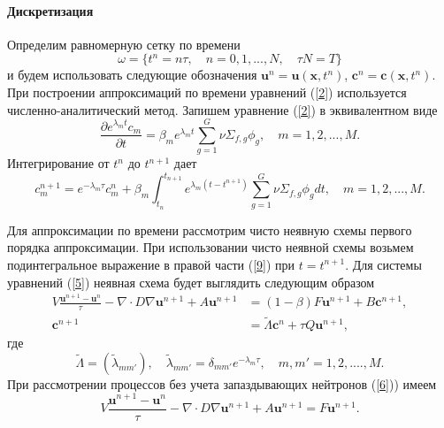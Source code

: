 \documentclass{crm-article}
\begin{document}
\paragraph{Дискретизация}
Определим равномерную сетку по времени
\[
\omega = \{ t^n=n \tau, \quad n = 0,1,...,N, \quad \tau N = T \}
\]
и будем использовать следующие обозначения $\bm{u}^n = \bm{u}(\bm{x}, t^n)$, $\bm c^n = \bm c(\bm{x}, t^n)$. 
При построении аппроксимаций по времени уравнений (\ref{2}) используется численно-аналитический метод.
Запишем уравнение (\ref{2}) в эквивалентном виде
\[
  \frac{\partial e^{\lambda_m t}  c_m}{\partial t} = \beta_m  e^{\lambda_m t} \sum_{g=1}^{G} \nu \Sigma_{f,g} \phi_g,
 \quad m = 1,2, ..., M .
\] 
Интегрирование от $t^{n}$ до $t^{n+1}$ дает
\begin{equation}\label{9}
c_m^{n+1} = e^{-\lambda_m\tau} c_m^n + \beta_m \int_{t_n}^{t_{n+1}}e^{\lambda_m (t-t^{n+1})} \sum_{g=1}^{G} \nu \Sigma_{f,g} \phi_g d t,
 \quad m = 1,2, ..., M.
\end{equation}

Для аппроксимации по времени рассмотрим чисто неявную схемы первого порядка аппроксимации. 
При использовании чисто неявной схемы возьмем подинтегральное выражение в правой части (\ref{9}) при $t = t^{n+1}$. 
Для системы уравнений (\ref{5}) неявная схема будет выглядить следующим образом
\begin{equation}\label{10}
\begin{split}
V \frac{\bm{u}^{n+1} - \bm{u}^n}{\tau} - \nabla\cdot D \nabla\bm{u}^{n+1}  + A\bm{u}^{n+1} &=(1-\beta) F \bm{u}^{n+1} + B\bm c^{n+1},
\\
\bm{c}^{n+1} & = \widetilde{\Lambda}\bm{c}^{n} + \tau Q \bm{u}^{n+1},
\end{split}
\end{equation}
где
\[
\widetilde{\Lambda} = (\widetilde{\lambda}_{mm'}), \quad \widetilde{\lambda}_{mm'} = \delta_{mm'} e^{-\lambda_m\tau},
 \quad m, m' = 1,2, ....,M .
\]
При рассмотрении процессов без учета запаздывающих нейтронов (\ref{6})) имеем
\begin{equation}\label{11}
V \frac{\bm{u}^{n+1} - \bm{u}^n}{\tau} -\nabla \cdot D \nabla \bm{u}^{n+1} + A \bm{u}^{n+1} = F \bm{u}^{n+1}.
\end{equation}
\end{document}
